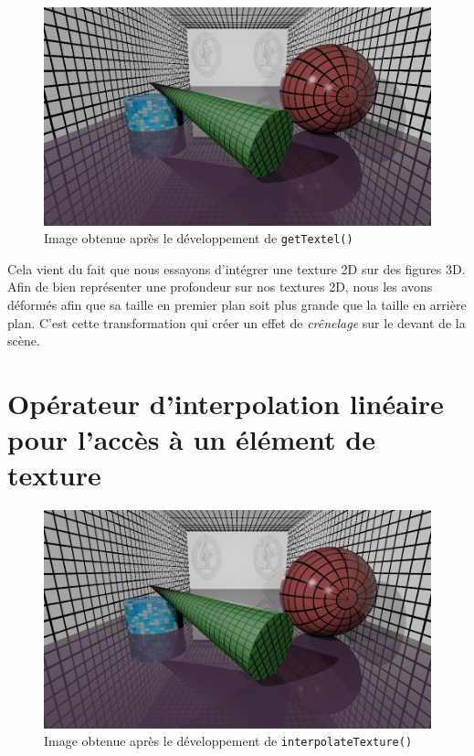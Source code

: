 \documentclass[a4paper, 11pt]{article}
\begin{document}
	\begin{figure}[H]
		\centering
		\includegraphics[width=12cm]{1-monimage.png}
		\caption{Image obtenue après le développement de \texttt{getTextel()}}
		\label{fig:fig1}
	\end{figure}
	Cela vient du fait que nous essayons d'intégrer une texture 2D sur des figures 3D. Afin de bien représenter une profondeur sur nos textures 2D, nous les
	avons déformés afin que sa taille en premier plan soit plus grande que la taille en arrière plan. C'est cette transformation qui créer un effet de
	\textit{crênelage} sur le devant de la scène.

	\section{Opérateur d'interpolation linéaire pour l'accès à un élément de texture}
	\begin{figure}[H]
		\centering
		\includegraphics[width=12cm]{2-monimage.png}
		\caption{Image obtenue après le développement de \texttt{interpolateTexture()}}
		\label{fig:fig1}
	\end{figure}
\end{document}
